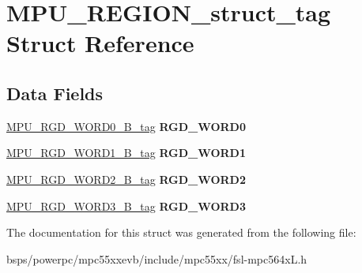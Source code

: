 \hypertarget{structMPU__REGION__struct__tag}{}\section{M\+P\+U\+\_\+\+R\+E\+G\+I\+O\+N\+\_\+struct\+\_\+tag Struct Reference}
\label{structMPU__REGION__struct__tag}
\subsection*{Data Fields}
\begin{DoxyCompactItemize}
\item 
\mbox{\label{structMPU__REGION__struct__tag_a2afc66772f02bdfea00fda60dcd81b2d}} 
\mbox{\hyperlink{unionMPU__RGD__WORD0__32B__tag}{M\+P\+U\+\_\+\+R\+G\+D\+\_\+\+W\+O\+R\+D0\+\_\+B\+\_\+tag}} {\bfseries R\+G\+D\+\_\+\+W\+O\+R\+D0}
\item 
\mbox{\label{structMPU__REGION__struct__tag_a8e1efc9c33ceeba4e3e6ecb6dbb12441}} 
\mbox{\hyperlink{unionMPU__RGD__WORD1__32B__tag}{M\+P\+U\+\_\+\+R\+G\+D\+\_\+\+W\+O\+R\+D1\+\_\+B\+\_\+tag}} {\bfseries R\+G\+D\+\_\+\+W\+O\+R\+D1}
\item 
\mbox{\label{structMPU__REGION__struct__tag_a7a3929ac581f50ad5b55b3d273209e82}} 
\mbox{\hyperlink{unionMPU__RGD__WORD2__32B__tag}{M\+P\+U\+\_\+\+R\+G\+D\+\_\+\+W\+O\+R\+D2\+\_\+B\+\_\+tag}} {\bfseries R\+G\+D\+\_\+\+W\+O\+R\+D2}
\item 
\mbox{\label{structMPU__REGION__struct__tag_a29ed4815f5bfc1d728c5fb2d2726a190}} 
\mbox{\hyperlink{unionMPU__RGD__WORD3__32B__tag}{M\+P\+U\+\_\+\+R\+G\+D\+\_\+\+W\+O\+R\+D3\+\_\+B\+\_\+tag}} {\bfseries R\+G\+D\+\_\+\+W\+O\+R\+D3}
\end{DoxyCompactItemize}


The documentation for this struct was generated from the following file\+:\begin{DoxyCompactItemize}
\item 
bsps/powerpc/mpc55xxevb/include/mpc55xx/fsl-\/mpc564x\+L.\+h\end{DoxyCompactItemize}

